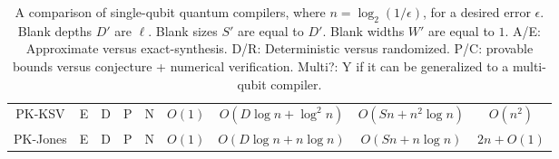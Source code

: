 \begin{landscape}
\begin{table}[hbt!]
\begin{tabular}{|c|c|c|c|c|c|c|c|c|}
PK-KSV \cite{Kitaev2002,Cleve2000} & E & D & P & N  & $O(1)$                            & $O(D\log n + \log^2 n)$ & $O(S n + n^2 \log n)$ & $O(n^2)$ \\
PK-Jones \cite{Jones2013}   & E  & D    & P  & N     & $O(1)$                           & $O(D\log n + n \log n)$ & $O(S n + n \log n)$   & $2n + O(1)$ \\
\end{tabular}
\caption{A comparison of single-qubit quantum compilers, where $n = \log_2(1/\epsilon)$, for a desired error $\epsilon$.
Blank depths $D'$ are $\ell$. Blank sizes $S'$ are equal to $D'$. Blank widths $W'$ are equal to $1$.
A/E: Approximate versus exact-synthesis. D/R: Deterministic versus randomized. P/C: provable bounds versus conjecture + numerical verification.
Multi?: Y if it can be generalized to a multi-qubit compiler.}
\label{tab:qcompile-compare}
\end{table}

\end{landscape}
